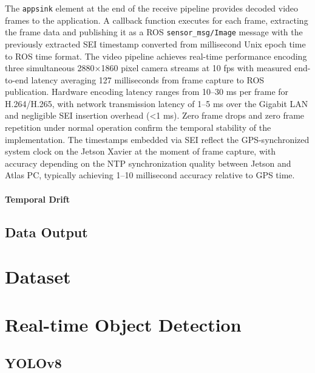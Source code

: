 \documentclass{erauthesis}
\begin{document}
The \texttt{appsink} element at the end of the receive pipeline provides decoded video frames to the application. A callback function executes for each frame, extracting the frame data and publishing it as a ROS \texttt{sensor\_msg/Image} message with the previously extracted \ac{SEI} timestamp converted from millisecond Unix epoch time to ROS time format. 
The video pipeline achieves real-time performance encoding three simultaneous 2880$\times$1860 pixel camera streams at 10 fps with measured end-to-end latency averaging 127 milliseconds from frame capture to ROS publication. Hardware encoding latency ranges from 10--30 ms per frame for H.264/H.265, with network transmission latency of 1--5 ms over the Gigabit LAN and negligible \ac{SEI} insertion overhead (<1 ms). Zero frame drops and zero frame repetition under normal operation confirm the temporal stability of the implementation. The timestamps embedded via \ac{SEI} reflect the GPS-synchronized system clock on the Jetson Xavier at the moment of frame capture, with accuracy depending on the \ac{NTP} synchronization quality between Jetson and Atlas PC, typically achieving 1--10 millisecond accuracy relative to GPS time.
            
            \subsubsection{Temporal Drift} \label{temporal_drift}
            
    \section{Data Output}

\chapter{Dataset} \label{dataset}

\chapter{Real-time Object Detection} \label{object-detection}

    \section{YOLOv8} \label{yolo}
\end{document}
